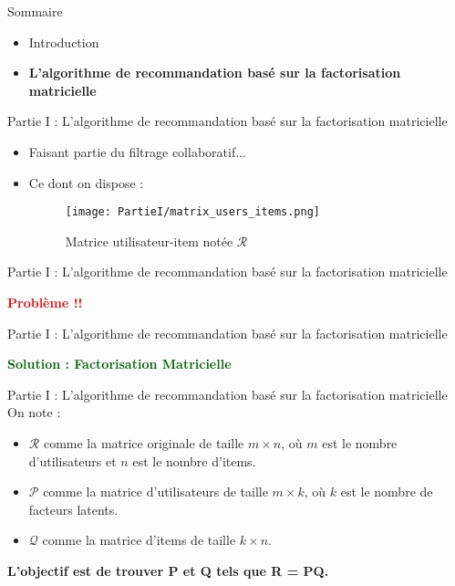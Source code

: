 \newcommand{\PartieI}{Partie I : L'algorithme de recommandation basé sur la factorisation matricielle}

\begin{frame}{Sommaire}
    \begin{itemize}
        \item Introduction
        \item \textbf{L'algorithme de recommandation basé sur la factorisation matricielle}
    \end{itemize}
\end{frame}

\begin{frame}{\PartieI}
    \begin{itemize}
        \item Faisant partie du filtrage collaboratif...
        \item {
              Ce dont on dispose :
              \begin{figure}[htbp]
                  \centering
                  \hspace{80pt}
                  \texttt{[image: PartieI/matrix\_users\_items.png]}
                  \caption{Matrice utilisateur-item notée $\mathcal{R}$}
                  \label{fig:matrix-user-item}
              \end{figure}
              }
    \end{itemize}
\end{frame}

\begin{frame}{\PartieI}
    \begin{center}
        \textcolor{red}{\textbf{\large{Problème !!}}}
    \end{center}
\end{frame}

\begin{frame}{\PartieI}
    \begin{center}
        \textcolor{darkgreen}{\textbf{\large{Solution : Factorisation Matricielle}}}
    \end{center}
\end{frame}

\begin{frame}{\PartieI}
    On note :
    \begin{itemize}
        \item $\mathcal{R}$ comme la matrice originale de taille $m \times n$, où $m$ est le nombre d'utilisateurs et $n$ est le nombre d'items.
        \item $\mathcal{P}$ comme la matrice d'utilisateurs de taille $m \times k$, où $k$ est le nombre de facteurs latents.
        \item $\mathcal{Q}$ comme la matrice d'items de taille $k \times n$.
    \end{itemize}
    \begin{center}
        \textbf{L'objectif est de trouver P et Q tels que R = PQ.}
    \end{center}
\end{frame}

